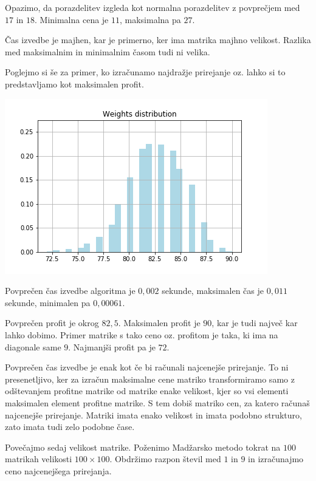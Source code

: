 \documentclass[a4paper, 12pt]{article}
\begin{document}
Opazimo, da porazdelitev izgleda kot normalna porazdelitev z povprečjem med $17$ in $18$.
Minimalna cena je $11$, maksimalna pa $27$. 

Čas izvedbe je majhen, kar je primerno, ker ima matrika majhno velikost. Razlika med maksimalnim
in minimalnim časom tudi ni velika.

\hfill \break
Poglejmo si še za primer, ko izračunamo najdražje prirejanje oz. lahko si to predstavljamo
kot maksimalen profit.

\includegraphics[width=\textwidth]{../slike/picture1011max.png}

Povprečen čas izvedbe algoritma je $0,002$ sekunde, maksimalen čas je $0,011$ sekunde, minimalen pa $0,00061$.

Povprečen profit je okrog $82,5$. Maksimalen profit je $90$, kar je tudi največ kar lahko
dobimo. Primer matrike s tako ceno oz. profitom je taka, ki ima na diagonale same $9$.
Najmanjši profit pa je $72$.

Povprečen čas izvedbe je enak kot če bi računali najcenejše prirejanje.
To ni presenetljivo, ker za izračun maksimalne
cene matriko transformiramo samo z odštevanjem profitne matrike od matrike enake velikost, kjer so 
vsi elementi maksimalen element profitne matrike. S tem dobiš matriko cen, za katero računaš
najcenejše prirejanje. Matriki imata enako velikost in imata
podobno strukturo, zato imata tudi zelo podobne čase.

\hfill \break
Povečajmo sedaj velikost matrike. Poženimo Madžarsko metodo tokrat na $100$ matrikah
velikosti $100 \times 100$. Obdržimo razpon števil med $1$ in $9$ in izračunajmo
ceno najcenejšega prirejanja.
\end{document}
